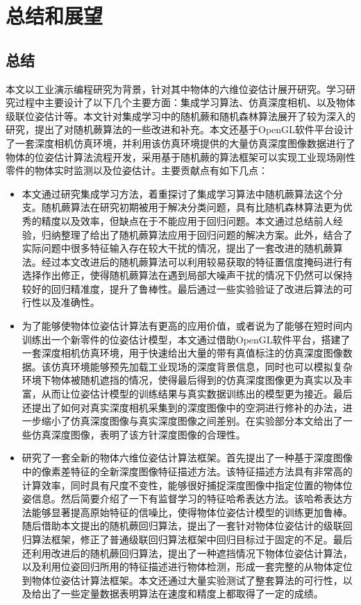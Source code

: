 \chapter{总结和展望}
\section{总结}

本文以工业演示编程研究为背景，针对其中物体的六维位姿估计展开研究。学习研究过程中主要设计了以下几个主要方面：集成学习算法、仿真深度相机、以及物体级联位姿估计等。本文针对集成学习中的随机蕨和随机森林算法展开了较为深入的研究，提出了对随机蕨算法的一些改进和补充。本文还基于OpenGL软件平台设计了一套深度相机仿真环境，并利用该仿真环境提供的大量仿真深度图像数据进行了物体的位姿估计算法流程开发，采用基于随机蕨的算法框架可以实现工业现场刚性零件的物体实时监测以及位姿估计。主要贡献点有如下几点：

\begin{itemize}
\item 本文通过研究集成学习方法，着重探讨了集成学习算法中随机蕨算法这个分支。随机蕨算法在研究初期被用于解决分类问题，具有比随机森林算法更为优秀的精度以及效率，但缺点在于不能应用于回归问题。本文通过总结前人经验，归纳整理了给出了随机蕨算法应用于回归问题的解决方案。此外，结合了实际问题中很多特征输入存在较大干扰的情况，提出了一套改进的随机蕨算法。经过本文改进后的随机蕨算法可以利用较易获取的特征置信度掩码进行有选择作出修正，使得随机蕨算法在遇到局部大噪声干扰的情况下仍然可以保持较好的回归精准度，提升了鲁棒性。最后通过一些实验验证了改进后算法的可行性以及准确性。

\item 为了能够使物体位姿估计算法有更高的应用价值，或者说为了能够在短时间内训练出一个新零件的位姿估计模型，本文通过借助OpenGL软件平台，搭建了一套深度相机仿真环境，用于快速给出大量的带有真值标注的仿真深度图像数据。该仿真环境能够预先加载工业现场的深度背景信息，同时也可以模拟复杂环境下物体被随机遮挡的情况，使得最后得到的仿真深度图像更为真实以及丰富，从而让位姿估计模型的训练结果与真实数据训练出的模型更为接近。最后还提出了如何对真实深度相机采集到的深度图像中的空洞进行修补的办法，进一步缩小了仿真深度图像与真实深度图像之间差别。在实验部分本文给出了一些仿真深度图像，表明了该方针深度图像的合理性。

\item 研究了一套全新的物体六维位姿估计算法框架。首先提出了一种基于深度图像中的像素差特征的全新深度图像特征描述方法。该特征描述方法具有非常高的计算效率，同时具有尺度不变性，能够很好捕捉深度图像中指定位置的物体位姿信息。然后简要介绍了一下有监督学习的特征哈希表达方法。该哈希表达方法能够显著提高原始特征的信噪比，使得物体位姿估计模型的训练更加鲁棒。随后借助本文提出的随机蕨回归算法，提出了一套针对物体位姿估计的级联回归算法框架，修正了普通级联回归算法框架中回归目标过于固定的不足。最后还利用改进后的随机蕨回归算法，提出了一种遮挡情况下物体位姿估计算法，以及利用位姿回归所用的特征描述进行物体检测，形成一套完整的从物体定位到物体位姿估计算法框架。本文还通过大量实验测试了整套算法的可行性，以及给出了一些定量数据表明算法在速度和精度上都取得了一定的成绩。
\end{itemize}


